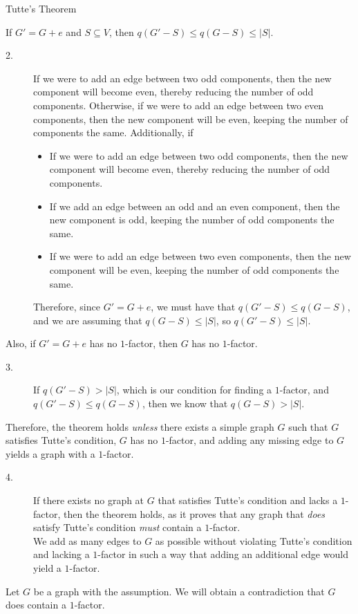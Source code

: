\documentclass[10pt]{extarticle}
\begin{document}
{\begin{problem}{Tutte's Theorem}
\begin{description}[font=\scshape]
        If $G' = G+e$ and $S\subseteq V$, then $q(G'-S)\leq q(G-S) \leq |S|$.
        \begin{description}
          \item[2.] If we were to add an edge between two odd components, then the new component will become even, thereby reducing the number of odd components. Otherwise, if we were to add an edge between two even components, then the new component will be even, keeping the number of components the same. Additionally, if 
            \begin{itemize}
              \item  If we were to add an edge between two odd components, then the new component will become even, thereby reducing the number of odd components.
              \item If we add an edge between an odd and an even component, then the new component is odd, keeping the number of odd components the same.
              \item If we were to add an edge between two even components, then the new component will be even, keeping the number of odd components the same. 
            \end{itemize}
            Therefore, since $G' = G + e$, we must have that $q(G'-S) \leq q(G-S)$, and we are assuming that $q(G-S) \leq |S|$, so $q(G'-S) \leq |S|$.
        \end{description}
        Also, if $G' = G + e$ has no $1$-factor, then $G$ has no $1$-factor.
        \begin{description}
          \item[3.] If $q(G'-S) > |S|$, which is our condition for finding a $1$-factor, and $q(G'-S) \leq q(G-S)$, then we know that $q(G-S) > |S|$.
        \end{description}
        Therefore, the theorem holds \textit{unless} there exists a simple graph $G$ such that $G$ satisfies Tutte's condition, $G$ has no $1$-factor, and adding any missing edge to $G$ yields a graph with a $1$-factor.
        \begin{description}
          \item[4.] If there exists no graph at $G$ that satisfies Tutte's condition and lacks a $1$-factor, then the theorem holds, as it proves that any graph that \textit{does} satisfy Tutte's condition \textit{must} contain a $1$-factor.\\

            We add as many edges to $G$ as possible without violating Tutte's condition and lacking a $1$-factor in such a way that adding an additional edge would yield a $1$-factor.
        \end{description}
        Let $G$ be a graph with the assumption. We will obtain a contradiction that $G$ does contain a $1$-factor.\\


\end{description}
\end{problem}}
\end{document}
